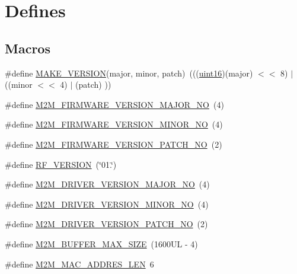 \hypertarget{group__WlanDefines}{}\section{Defines}
\label{group__WlanDefines}
\subsection*{Macros}
\begin{DoxyCompactItemize}
\item 
\#define \hyperlink{group__WlanDefines_gaedb42f7681d2a954c9ada2752b362544}{M\+A\+K\+E\+\_\+\+V\+E\+R\+S\+I\+ON}(major,  minor,  patch)~(((\hyperlink{group__DataT_ga1daa745171fc6e31d942c161422a76f9}{uint16})(major) $<$$<$ 8) $\vert$ ((minor $<$$<$ 4) $\vert$ (patch) ))
\item 
\#define \hyperlink{group__WlanDefines_gad554e7c1f3f424e4d42dc110f4e6b3bb}{M2\+M\+\_\+\+F\+I\+R\+M\+W\+A\+R\+E\+\_\+\+V\+E\+R\+S\+I\+O\+N\+\_\+\+M\+A\+J\+O\+R\+\_\+\+NO}~(4)
\item 
\#define \hyperlink{group__WlanDefines_gae853c27e4ef82c81c433b20a91ed39d6}{M2\+M\+\_\+\+F\+I\+R\+M\+W\+A\+R\+E\+\_\+\+V\+E\+R\+S\+I\+O\+N\+\_\+\+M\+I\+N\+O\+R\+\_\+\+NO}~(4)
\item 
\#define \hyperlink{group__WlanDefines_gad47b0da26744046fe552307d8c5446e5}{M2\+M\+\_\+\+F\+I\+R\+M\+W\+A\+R\+E\+\_\+\+V\+E\+R\+S\+I\+O\+N\+\_\+\+P\+A\+T\+C\+H\+\_\+\+NO}~(2)
\item 
\#define \hyperlink{group__WlanDefines_gaf046e0683b1afb87ebe80f2015fc46c4}{R\+F\+\_\+\+V\+E\+R\+S\+I\+ON}~(\char`\"{}01.\char`\"{})
\item 
\#define \hyperlink{group__WlanDefines_ga841654a809488d03e49e3ae02435751f}{M2\+M\+\_\+\+D\+R\+I\+V\+E\+R\+\_\+\+V\+E\+R\+S\+I\+O\+N\+\_\+\+M\+A\+J\+O\+R\+\_\+\+NO}~(4)
\item 
\#define \hyperlink{group__WlanDefines_ga9165dca612db5f17f11e9a5b2abe1290}{M2\+M\+\_\+\+D\+R\+I\+V\+E\+R\+\_\+\+V\+E\+R\+S\+I\+O\+N\+\_\+\+M\+I\+N\+O\+R\+\_\+\+NO}~(4)
\item 
\#define \hyperlink{group__WlanDefines_ga57f6c956ee5e267cd064d281bc1df051}{M2\+M\+\_\+\+D\+R\+I\+V\+E\+R\+\_\+\+V\+E\+R\+S\+I\+O\+N\+\_\+\+P\+A\+T\+C\+H\+\_\+\+NO}~(2)
\item 
\#define \hyperlink{group__WlanDefines_ga6f3248a7b4183edf67a16a5cd445efea}{M2\+M\+\_\+\+B\+U\+F\+F\+E\+R\+\_\+\+M\+A\+X\+\_\+\+S\+I\+ZE}~(1600\+U\+L -\/ 4)
\item 
\#define \hyperlink{group__WlanDefines_ga6884f9d5fed2dd058a1bbf4358b5c263}{M2\+M\+\_\+\+M\+A\+C\+\_\+\+A\+D\+D\+R\+E\+S\+\_\+\+L\+EN}~6

\end{DoxyCompactItemize}
